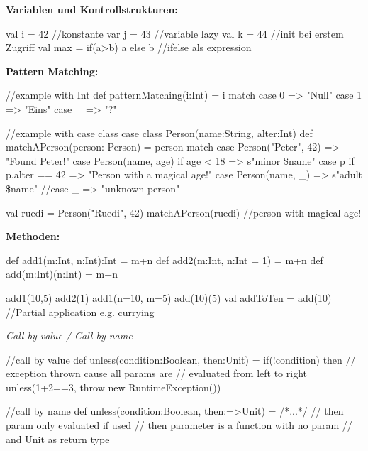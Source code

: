\begin{breakbox}
\textbf{Variablen und Kontrollstrukturen:}\\
\begin{scalacode}
val i = 42 //konstante
var j = 43 //variable
lazy val k = 44 //init bei erstem Zugriff
val max = if(a>b) a else b //ifelse als expression
\end{scalacode}
\end{breakbox}

\begin{breakbox}
\textbf{Pattern Matching:}\\
\begin{scalacode}
//example with Int
def patternMatching(i:Int) = {
  i match {
    case 0 => "Null"
    case 1 => "Eins"
    case _ => "?"
  }
}

//example with case class
case class Person(name:String, alter:Int)
def matchAPerson(person: Person) = {
  person match {
    case Person("Peter", 42)           => "Found Peter!"
    case Person(name, age) if age < 18 => s"minor \$name"
    case p if p.alter == 42   => "Person with a magical age!"
    case Person(name, _)               => s"adult \$name"
    //case _                             => "unknown person"
  }
}

val ruedi = Person("Ruedi", 42)
matchAPerson(ruedi) //person with magical age!
\end{scalacode}
\end{breakbox}

\begin{breakbox}
\textbf{Methoden:}\\
\begin{scalacode}
def add1(m:Int, n:Int):Int = {m+n}
def add2(m:Int, n:Int = 1) = m+n
def add(m:Int)(n:Int) = m+n

add1(10,5)
add2(1)
add1(n=10, m=5)
add(10)(5)
val addToTen = add(10) _ //Partial application e.g. currying
\end{scalacode}

\emph{Call-by-value / Call-by-name}\\
\begin{scalacode}
//call by value
def unless(condition:Boolean, then:Unit) = {
	if(!condition) { then }
}
// exception thrown cause all params are
// evaluated from left to right
unless(1+2==3, throw new RuntimeException()) 

//call by name
def unless(condition:Boolean, then:=>Unit) = {/*...*/}
// then param only evaluated if used
// then parameter is a function with no param 
// and Unit as return type
\end{scalacode}
\end{breakbox}

